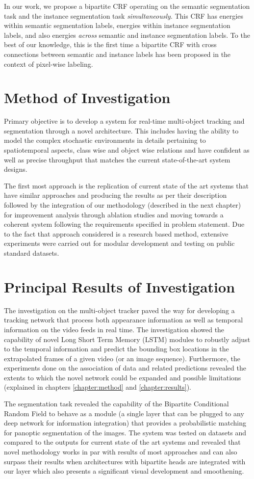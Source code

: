 In our work, we propose a bipartite CRF operating on the semantic segmentation task and the instance segmentation task \emph{simultaneously}. This CRF has energies within semantic segmentation labels, energies within instance segmentation labels, and also energies \emph{across} semantic and instance segmentation labels. To the best of our knowledge, this is the first time a bipartite CRF with cross connections between semantic and instance labels has been proposed in the context of pixel-wise labeling.

\section{Method of Investigation}
 Primary objective is to develop a system for real-time multi-object tracking and segmentation through a novel architecture. This includes having the ability to model the complex stochastic environments in details pertaining to spatiotemporal aspects, class wise and object wise relations and have confident as well as precise throughput that matches the current state-of-the-art system designs. 
 
 The first most approach is the replication of current state of the art systems that have similar approaches and producing the results as per their description followed by the integration of our methodology (described in the next chapter) for improvement analysis through ablation studies and moving towards a coherent system following the requirements specified in problem statement. Due to the fact that approach considered is a research based method, extensive experiments were carried out for modular development and testing on public standard datasets. 
 
 
\section{Principal Results of Investigation}
The investigation on the multi-object tracker paved the way for developing a tracking network that process both appearance information as well as temporal information on the video feeds in real time. The investigation showed the capability of novel Long Short Term Memory (LSTM) modules to robustly adjust to the temporal information and predict the bounding box locations in the extrapolated frames of a given video (or an image sequence). Furthermore, the experiments done on the association of data and related predictions revealed the extents to which the novel network could be expanded and possible limitations (explained in chapters \ref{chapter:method} and \ref{chapter:results}).

The segmentation task revealed the capability of the Bipartite Conditional Random Field to behave as a module (a single layer that can be plugged to any deep network for information integration) that provides a probabilistic matching for panoptic segmentation of the images. The system was tested on datasets and compared to the outputs for current state of the art systems and revealed that novel methodology works in par with results of most approaches and can also surpass their results when architectures with bipartite heads are integrated with our layer which also presents a significant visual development and smoothening.  